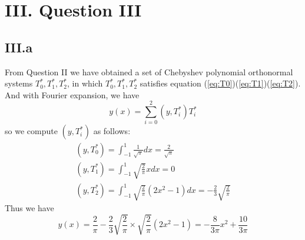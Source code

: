 \documentclass[a4paper]{article}
\begin{document}
\section*{III. Question III}

\subsection*{III.a}
From Question II we have obtained a set of Chebyshev polynomial orthonormal systems ${T_0^*,T_1^*,T_2^*}$, in which $T_0^*,T_1^*,T_2^*$ satisfies equation (\ref{eq:T0})(\ref{eq:T1})(\ref{eq:T2}).
And with Fourier expansion, we have
\begin{equation}
  y(x)=\sum_{i=0}^2(y,T_i^{*})T_i^{*}
\end{equation}
so we compute $(y,T_i^{*})$ as follows:
\begin{align}
  (y,T_0^{*})=\int_{-1}^1\frac{1}{\sqrt{\pi}}dx=\frac{2}{\sqrt{\pi}}\\
  (y,T_1^*)=\int_{-1}^1\sqrt{\frac{2}{\pi}}xdx=0\\
  (y,T_2^*)=\int_{-1}^1\sqrt{\frac{2}{\pi}}(2x^2-1)dx=-\frac{2}{3}\sqrt{\frac{2}{\pi}}
\end{align}
Thus we have
\begin{equation}
  y(x)=\frac{2}{\pi}-\frac{2}{3}\sqrt{\frac{2}{\pi}}\times \sqrt{\frac{2}{\pi}}(2x^2-1)=-\frac{8}{3\pi}x^2+\frac{10}{3\pi}
\end{equation}
\end{document}
